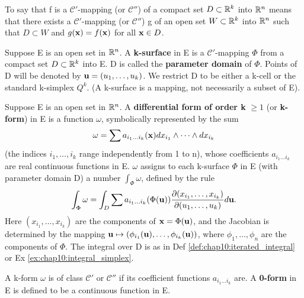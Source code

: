\begin{remark}
  \label{rem:chap10:diff_on_compact}
  To say that f is a $\mathcal{C}'$-mapping (or $\mathcal{C}''$) of a
  compact set $D \subset \mathbb{R}^k$ into $\mathbb{R}^n$ means that there exists a
  $\mathcal{C}'$-mapping (or $\mathcal{C}''$) g of an open set $W
  \subset \mathbb{R}^k$ into $\mathbb{R}^n$ such that $D \subset W$ and $g(\mathbf{x})
  = f(\mathbf{x})$ for all $\mathbf{x} \in D$.
\end{remark}

\begin{definition}[k-surface]
  \label{def:chap10:k-surface}
  Suppose E is an open set in $\mathbb{R}^n$. A \textbf{k-surface} in E is a
  $\mathcal{C}'$-mapping $\Phi$ from a compact set $D \subset \mathbb{R}^k$
  into E. D is called the \textbf{parameter domain} of $\Phi$. Points
  of D will be denoted by $\mathbf{u} = (u_1, \dots, u_k)$.
  We restrict D to be either a k-cell or the standard k-simplex
  $Q^k$. (A k-surface is a mapping, not necessarily a subset of E).
\end{definition}

\begin{definition}
  \label{def:chap10:k-form_definition}
  Suppose E is an open set in $\mathbb{R}^n$. A \textbf{differential form of
  order k} $\ge 1$ (or \textbf{k-form}) in E is a function $\omega$,
  symbolically represented by the sum
  \[
    \omega = \sum a_{i_1 \dots i_k}(\mathbf{x}) dx_{i_1} \wedge \dots
    \wedge dx_{i_k}
  \]
  (the indices $i_1, \dots, i_k$ range independently from 1 to n),
  whose coefficients $a_{i_1 \dots i_k}$ are real continuous functions in E.
  $\omega$ assigns to each k-surface $\Phi$ in E (with parameter
  domain D) a number $\int_\Phi \omega$, defined by the rule
  \[
    \int_\Phi \omega = \int_D \sum a_{i_1 \dots i_k}(\Phi(\mathbf{u}))
    \frac{\partial(x_{i_1}, \dots, x_{i_k})}{\partial(u_1, \dots,
    u_k)} d\mathbf{u}.
  \]
  Here $(x_{i_1}, \dots, x_{i_k})$ are the components of $\mathbf{x} =
  \Phi(\mathbf{u})$, and the Jacobian is determined by the mapping
  $\mathbf{u} \mapsto ( \phi_{i_1}(\mathbf{u}), \dots,
  \phi_{i_k}(\mathbf{u}) )$, where $\phi_1, \dots, \phi_n$ are the
  components of $\Phi$. The integral over D is as in Def
  \ref{def:chap10:iterated_integral} or Ex \ref{ex:chap10:integral_simplex}.

  A k-form $\omega$ is of class $\mathcal{C}'$ or $\mathcal{C}''$ if
  its coefficient functions $a_{i_1 \dots i_k}$ are.
  A \textbf{0-form} in E is defined to be a continuous function in E.
\end{definition}

